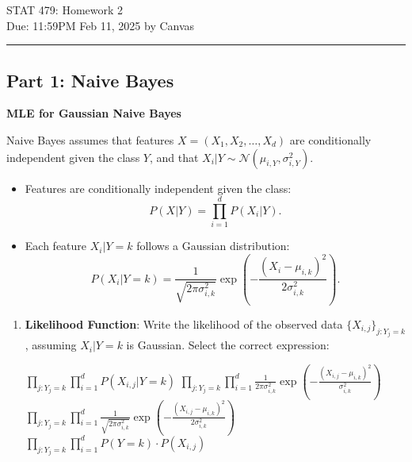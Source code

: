 \documentclass[12pt,letterpaper, onecolumn]{exam}
\begin{document}
\begingroup
    \centering
    \LARGE STAT 479: Homework 2\\[0.5em]
    \large Due: 11:59PM Feb 11, 2025 by Canvas\\[0.5em]
\endgroup
\rule{\textwidth}{0.4pt}
\pointsdroppedatright   %
\printanswers
\renewcommand{\solutiontitle}{\noindent\textbf{Answer:}\enspace}


\begin{questions}

\section*{Part 1: Naive Bayes}

\question[20 points]\textbf{MLE for Gaussian Naive Bayes}\droppoints

Naive Bayes assumes that features \( X = (X_1, X_2, \dots, X_d) \) are conditionally independent given the class \( Y \), and that \( X_i | Y \sim \mathcal{N}(\mu_{i,Y}, \sigma_{i,Y}^2) \).

\begin{itemize}
    \item Features are conditionally independent given the class:
    \[
    P(X|Y) = \prod_{i=1}^d P(X_i|Y).
    \]
    \item Each feature \( X_i|Y=k \) follows a Gaussian distribution:
    \[
    P(X_i|Y=k) = \frac{1}{\sqrt{2\pi \sigma_{i,k}^2}} \exp\left(-\frac{(X_i - \mu_{i,k})^2}{2\sigma_{i,k}^2}\right).
    \]
\end{itemize}

\begin{enumerate}[label=(\alph*)]
    \item \textbf{Likelihood Function}: Write the likelihood of the observed data \( \{X_{i,j}\}_{j : Y_j = k} \), assuming \( X_i|Y=k \) is Gaussian. Select the correct expression:
    \begin{choices}
        \choice \( \prod_{j : Y_j=k} \prod_{i=1}^d P(X_{i,j}|Y=k) \)
        \choice \( \prod_{j : Y_j=k} \prod_{i=1}^d \frac{1}{2\pi \sigma_{i,k}^2} \exp\left(-\frac{(X_{i,j} - \mu_{i,k})^2}{\sigma_{i,k}^2}\right) \)
        \choice \( \prod_{j : Y_j=k} \prod_{i=1}^d \frac{1}{\sqrt{2\pi \sigma_{i,k}^2}} \exp\left(-\frac{(X_{i,j} - \mu_{i,k})^2}{2\sigma_{i,k}^2}\right) \)
        \choice \( \prod_{j : Y_j=k} \prod_{i=1}^d P(Y=k) \cdot P(X_{i,j}) \)
    \end{choices}


\end{enumerate}
\end{questions}
\end{document}

